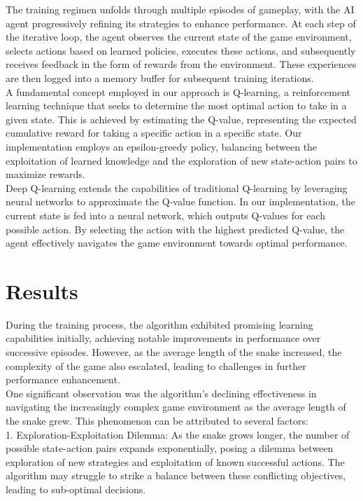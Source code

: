 \documentclass[paper=a4, fontsize=11pt,twoside]{scrartcl}
\begin{document}
The training regimen unfolds through multiple episodes of gameplay, with the AI agent progressively refining its strategies to enhance performance. At each step of the iterative loop, the agent observes the current state of the game environment, selects actions based on learned policies, executes these actions, and subsequently receives feedback in the form of rewards from the environment. These experiences are then logged into a memory buffer for subsequent training iterations.\\

A fundamental concept employed in our approach is Q-learning, a reinforcement learning technique that seeks to determine the most optimal action to take in a given state. This is achieved by estimating the Q-value, representing the expected cumulative reward for taking a specific action in a specific state. Our implementation employs an epsilon-greedy policy, balancing between the exploitation of learned knowledge and the exploration of new state-action pairs to maximize rewards.\\

Deep Q-learning extends the capabilities of traditional Q-learning by leveraging neural networks to approximate the Q-value function. In our implementation, the current state is fed into a neural network, which outputs Q-values for each possible action. By selecting the action with the highest predicted Q-value, the agent effectively navigates the game environment towards optimal performance.\\


\section{Results}

During the training process, the algorithm exhibited promising learning capabilities initially, achieving notable improvements in performance over successive episodes. However, as the average length of the snake increased, the complexity of the game also escalated, leading to challenges in further performance enhancement.\\

One significant observation was the algorithm's declining effectiveness in navigating the increasingly complex game environment as the average length of the snake grew. This phenomenon can be attributed to several factors:\\

1. Exploration-Exploitation Dilemma: As the snake grows longer, the number of possible state-action pairs expands exponentially, posing a dilemma between exploration of new strategies and exploitation of known successful actions. The algorithm may struggle to strike a balance between these conflicting objectives, leading to sub-optimal decisions.\\
\end{document}
